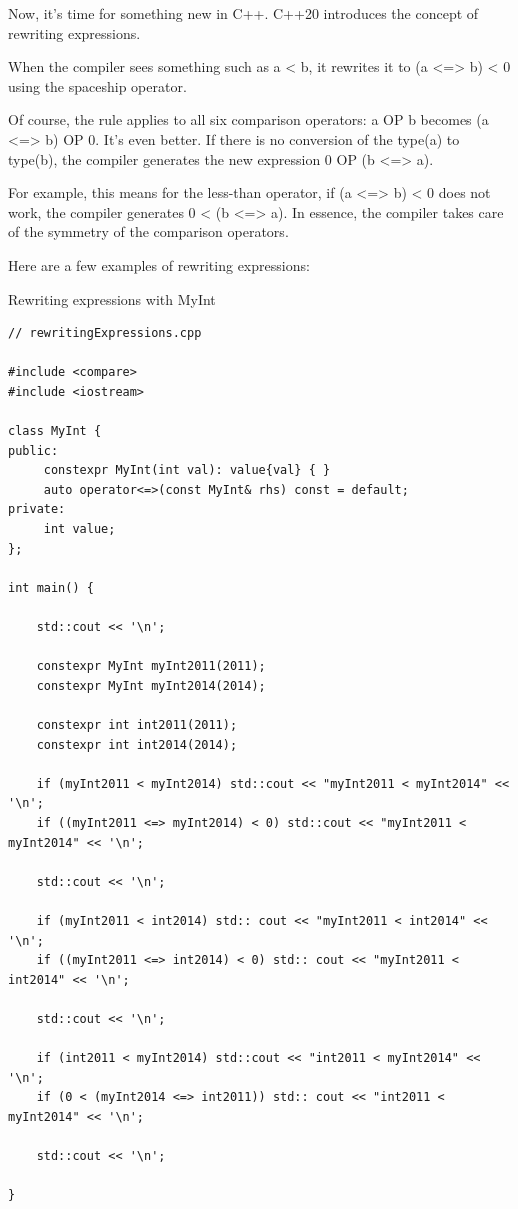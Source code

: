 Now, it’s time for something new in C++. C++20 introduces the concept of rewriting expressions.


When the compiler sees something such as a < b, it rewrites it to (a <=> b) < 0 using the spaceship operator.

Of course, the rule applies to all six comparison operators: a OP b becomes (a <=> b) OP 0. It’s even better. If there is no conversion of the type(a) to type(b), the compiler generates the new expression 0 OP (b <=> a).

For example, this means for the less-than operator, if (a <=> b) < 0 does not work, the compiler generates 0 < (b <=> a). In essence, the compiler takes care of the symmetry of the comparison operators.

Here are a few examples of rewriting expressions:

\noindent
Rewriting expressions with MyInt
\begin{lstlisting}[style=styleCXX]
// rewritingExpressions.cpp

#include <compare>
#include <iostream>

class MyInt {
public:
	 constexpr MyInt(int val): value{val} { }
	 auto operator<=>(const MyInt& rhs) const = default;
private:
	 int value;
};

int main() {
	
	std::cout << '\n';
	
	constexpr MyInt myInt2011(2011);
	constexpr MyInt myInt2014(2014);
	
	constexpr int int2011(2011);
	constexpr int int2014(2014);
	
	if (myInt2011 < myInt2014) std::cout << "myInt2011 < myInt2014" << '\n';
	if ((myInt2011 <=> myInt2014) < 0) std::cout << "myInt2011 < myInt2014" << '\n';
	
	std::cout << '\n';
	
	if (myInt2011 < int2014) std:: cout << "myInt2011 < int2014" << '\n';
	if ((myInt2011 <=> int2014) < 0) std:: cout << "myInt2011 < int2014" << '\n';
	
	std::cout << '\n';
	
	if (int2011 < myInt2014) std::cout << "int2011 < myInt2014" << '\n';
	if (0 < (myInt2014 <=> int2011)) std:: cout << "int2011 < myInt2014" << '\n';
	
	std::cout << '\n';

}
\end{lstlisting}

